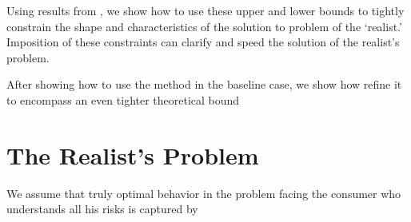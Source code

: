 \documentclass[titlepage,abstract, headings=optiontotocandhead]{\econtex}
\begin{document}
Using results from \cite{BufferStockTheory}, we show how to use these upper and lower bounds to tightly constrain the shape and characteristics of the solution to problem of the `realist.'  Imposition of these constraints can clarify and speed the solution of the realist's problem.

After showing how to use the method in the baseline case, we show how refine it to encompass an even tighter theoretical bound

\hypertarget{the-realists-problem}{}
\section{The Realist's Problem}

We assume that truly optimal behavior in the problem facing the consumer who understands all his risks is captured by

\notinsubfile{} 
\end{document}
